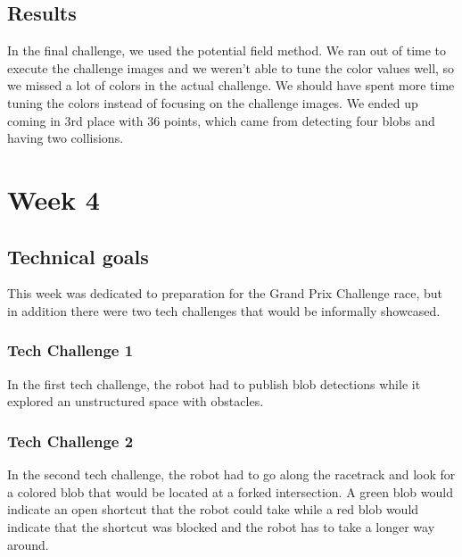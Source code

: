 \documentclass[journal, a4paper]{IEEEtran}
\begin{document}
\subsection{Results}
In the final challenge, we used the potential field method. We ran out of time to execute the challenge images and we weren’t able to tune the color values well, so we missed a lot of colors in the actual challenge. We should have spent more time tuning the colors instead of focusing on the challenge images. We ended up coming in 3rd place with 36 points, which came from detecting four blobs and having two collisions. 

\section{Week 4}
\subsection{Technical goals}
This week was dedicated to preparation for the Grand Prix Challenge race, but in addition there were two tech challenges that would be informally showcased. 
\subsubsection{Tech Challenge 1}
In the first tech challenge, the robot had to publish blob detections while it explored an unstructured space with obstacles.  
\subsubsection{Tech Challenge 2}
In the second tech challenge, the robot had to go along the racetrack and look for a colored blob that would be located at a forked intersection. A green blob would indicate an open shortcut that the robot could take while a red blob would indicate that the shortcut was blocked and the robot has to take a longer way around. \\ 
\end{document}
